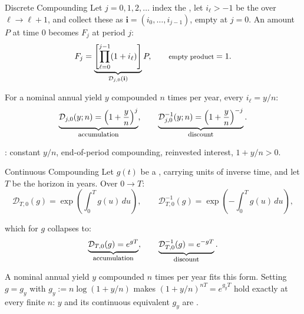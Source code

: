\documentclass[aspectratio=169,11pt]{beamer}
\begin{document}
\begin{frame}{Discrete Compounding}
  Let $j=0,1,2,\ldots$ index the \textbf{}, let
  $i_\ell>-1$ be the \mbox{} over
  $\ell\rightarrow\ell+1$, and collect these as $\mathbf i=(i_0,\ldots,i_{j-1})$,
  empty at $j=0$. An amount $P$ at time $0$ becomes $F_j$ at period $j$:
  \vspace{-0.3em}
  \[
    F_j=\underbrace{\left[\prod_{\ell=0}^{j-1}(1+i_\ell)\right]}_{\mathcal D_{j,0}(\mathbf i)}P ,
    \qquad \text{\footnotesize empty product} = 1 .
  \]
  \vspace{-0.55em}

  For a nominal annual yield $y$ compounded $n$ times per year, every
  $i_\ell=y/n$:
  \vspace{-0.3em}
  \[
    \underbrace{\mathcal D_{j,0}(y;n)=\left(1+\frac{y}{n}\right)^{j}}_{\text{\footnotesize accumulation}},
    \qquad
    \underbrace{\mathcal D_{j,0}^{-1}(y;n)=\left(1+\frac{y}{n}\right)^{-j}}_{\text{\footnotesize discount}}.
  \]

  \vspace{0.05em}
  {\small {}: constant $y/n$, end-of-period compounding,
  reinvested interest, $1+y/n>0$.}

\end{frame}

\begin{frame}{Continuous Compounding}
  Let $g(t)$ be a , carrying units of
  inverse time, and let $T$ be the horizon in years. Over $0\rightarrow T$:
  \vspace{-0.2em}
  \[
    \mathcal D_{T,0}(g)=\exp\left(\int_0^T g(u)\,du\right),
    \qquad
    \mathcal D_{T,0}^{-1}(g)=\exp\left(-\int_0^T g(u)\,du\right),
  \]
  \vspace{-0.6em}

  which for  $g$ collapses to:
  \vspace{-0.2em}
  \[
    \underbrace{\mathcal D_{T,0}(g)=e^{gT}}_{\text{\footnotesize accumulation}},
    \qquad
    \underbrace{\mathcal D_{T,0}^{-1}(g)=e^{-gT}}_{\text{\footnotesize discount}}.
  \]

  A nominal annual yield $y$ compounded $n$ times per year fits this form.
  Setting $g=g_y$ with $g_y:=n\log\left(1+y/n\right)$ makes
  $\left(1+y/n\right)^{nT}=e^{g_yT}$ hold exactly at every finite $n$: $y$ and
  its continuous equivalent $g_y$ are
  \textbf{}.

\end{frame}
\end{document}
